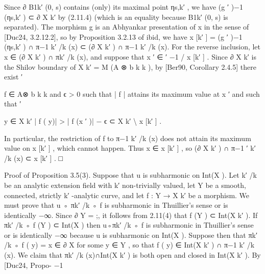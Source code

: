 \documentclass[
  10pt,
]{article}
\newenvironment{Shaded}{}{}
\newcommand{\NormalTok}[1]{#1}
\begin{document}
\begin{Shaded}
\begin{Highlighting}[]
\NormalTok{Since ∂ B1k′ (0, s) contains (only) its maximal point ηs,k′ , we have (g ′ )−1 (ηs,k′ ) ⊂ ∂ X k′}
\NormalTok{by (2.11.4) (which is an equality because B1k′ (0, s) is separated). The morphism g is an}
\NormalTok{Abhyankar presentation of x in the sense of [Duc24, 3.2.12.2], so by Proposition 3.2.13}
\NormalTok{of ibid, we have x [k′ ] = (g ′ )−1 (ηs,k′ ) ∩ π−1}
\NormalTok{                                                k′ /k}
\NormalTok{                                                      (x) ⊂ (∂ X k′ ) ∩ π−1}
\NormalTok{                                                                         k′ /k}
\NormalTok{                                                                               (x).}
\NormalTok{   For the reverse inclusion, let x ∈ (∂ X k′ ) ∩ πk′ /k (x), and suppose that x ′ ∈}
\NormalTok{                                        ′                   −1}
\NormalTok{                                                                                         / x [k′ ] . Since}
\NormalTok{∂ X k′ is the Shilov boundary of X k′ = M (A ⊗         b k k ), by [Ber90, Corollary 2.4.5] there exist}
\NormalTok{                                                            ′}

\NormalTok{f ∈ A⊗   b k k and ϵ \textgreater{} 0 such that | f | attains its maximum value at x ′ and such that}
\NormalTok{              ′}

                          
\NormalTok{                            y ∈ X k′ | f ( y)| \textgreater{} | f (x ′ )| − ϵ ⊂ X k′ \textbackslash{} x [k′ ] .}

\NormalTok{In particular, the restriction of f to π−1}
\NormalTok{                                        k′ /k}
\NormalTok{                                              (x) does not attain its maximum value on x [k′ ] ,}
\NormalTok{which cannot happen. Thus x ∈ x [k′ ] , so (∂ X k′ ) ∩ π−1}
\NormalTok{                                 ′}
\NormalTok{                                                         k′ /k}
\NormalTok{                                                               (x) ⊂ x [k′ ] .             □}

\NormalTok{Proof of Proposition 3.5(3). Suppose that u is subharmonic on Int(X ). Let k′ /k be an}
\NormalTok{analytic extension field with k′ non{-}trivially valued, let Y be a smooth, connected, strictly}
\NormalTok{k′ {-}analytic curve, and let f : Y → X k′ be a morphism. We must prove that u ◦ πk′ /k ◦}
\NormalTok{f is subharmonic in Thuillier’s sense or is identically −∞. Since ∂ Y = ;, it follows}
\NormalTok{from 2.11(4) that f (Y ) ⊂ Int(X k′ ). If πk′ /k ◦ f (Y ) ⊂ Int(X ) then u◦πk′ /k ◦ f is subharmonic}
\NormalTok{in Thuillier’s sense or is identically −∞ because u is subharmonic on Int(X ). Suppose}
\NormalTok{then that πk′ /k ◦ f ( y) = x ∈ ∂ X for some y ∈ Y , so that f ( y) ∈ Int(X k′ ) ∩ π−1                 k′ /k}
\NormalTok{                                                                                                             (x).}
\NormalTok{    We claim that πk′ /k (x)∩Int(X k′ ) is both open and closed in Int(X k′ ). By [Duc24, Propo{-}}
\NormalTok{                         −1}


\end{Highlighting}
\end{Shaded}
\end{document}
